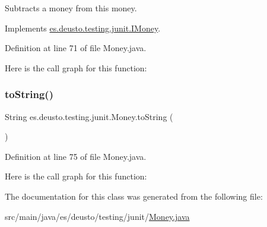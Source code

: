Subtracts a money from this money. 

Implements \mbox{\hyperlink{interfacees_1_1deusto_1_1testing_1_1junit_1_1_i_money_a1fb4981aa759e3fe0679654bec7a8b61}{es.\+deusto.\+testing.\+junit.\+I\+Money}}.



Definition at line 71 of file Money.\+java.

Here is the call graph for this function\+:
\mbox{\label{classes_1_1deusto_1_1testing_1_1junit_1_1_money_af9e655069123757bea0efecc4efcd638}} 
\subsubsection{\texorpdfstring{to\+String()}{toString()}}
{\footnotesize\ttfamily String es.\+deusto.\+testing.\+junit.\+Money.\+to\+String (\begin{DoxyParamCaption}{ }\end{DoxyParamCaption})}



Definition at line 75 of file Money.\+java.

Here is the call graph for this function\+:


The documentation for this class was generated from the following file\+:\begin{DoxyCompactItemize}
\item 
src/main/java/es/deusto/testing/junit/\mbox{\hyperlink{_money_8java}{Money.\+java}}\end{DoxyCompactItemize}
